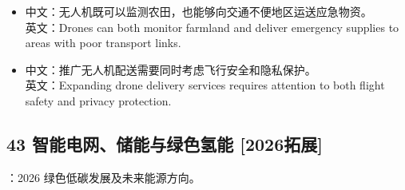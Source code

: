 \documentclass[a4paper,11pt,UTF8,fontset=none]{ctexart}
\begin{document}
\par

\begin{itemize}[leftmargin=1.7em,itemsep=1pt,parsep=0pt,topsep=2pt]
\item \noindent 中文：无人机既可以监测农田，也能够向交通不便地区运送应急物资。\\ 英文：Drones can both monitor farmland and deliver emergency supplies to areas with poor transport links.\par


\item \noindent 中文：推广无人机配送需要同时考虑飞行安全和隐私保护。\\ 英文：Expanding drone delivery services requires attention to both flight safety and privacy protection.\par


\end{itemize}

\subsection{43 智能电网、储能与绿色氢能 {\color{AccentBlue} [2026拓展]}}

\begin{tcolorbox}[enhanced,breakable,boxrule=0.35pt,colback=VeryPaleBlue,colframe=AccentBlue!40,left=7pt,right=7pt,top=4pt,bottom=4pt,borderline west={2pt}{0pt}{AccentBlue},before skip=4pt,after skip=6pt]
：2026 绿色低碳发展及未来能源方向。\par


\end{tcolorbox}
\end{document}
